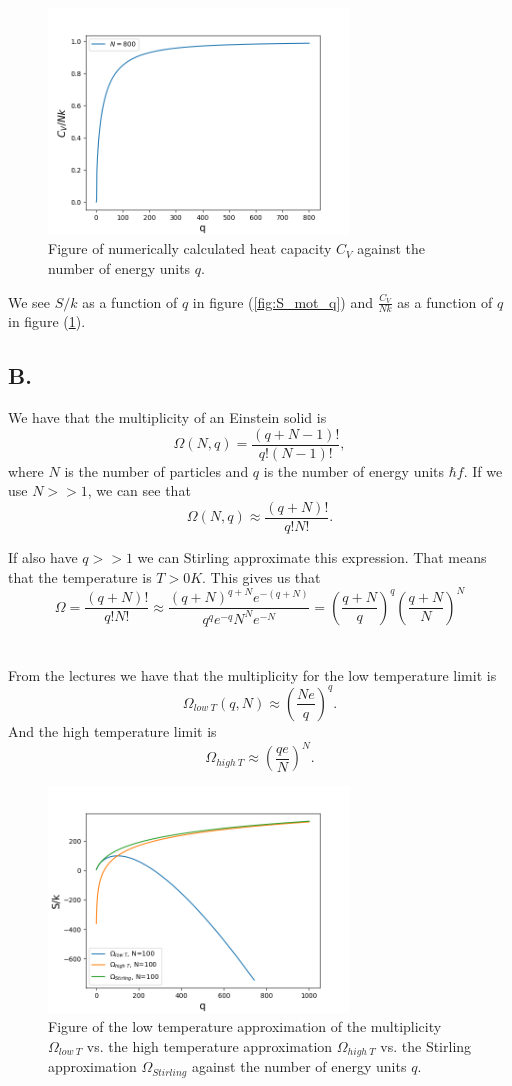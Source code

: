 \documentclass[reprint,english,notitlepage]{revtex4-1}  %
\begin{document}
\begin{figure}
\centering
\includegraphics[width=8cm]{../figures/C_mot_q.png}
\caption{Figure of numerically calculated heat capacity $C_V$ against the number of energy units $q$.}
\label{fig:C_mot_q}
\end{figure}

We see $S/k$ as a function of $q$ in figure (\ref{fig:S_mot_q}) and $\frac{C_V}{Nk}$ as a function of $q$ in figure (\ref{fig:C_mot_q}).

\subsection*{B.}

We have that the multiplicity of an Einstein solid is $$\Omega(N,q)=\frac{(q+N-1)!}{q!(N-1)!},$$
where $N$ is the number of particles and $q$ is the number of energy units $\hbar f$. If we use $N>>1$, we can see that $$ \Omega(N,q)\approx \frac{(q+N)!}{q!N!}.$$

If also have $q>>1$ we can Stirling approximate this expression. That means that the temperature is $T>0K$. This gives us that
$$ \Omega = \frac{(q+N)!}{q!N!}\approx\frac{(q+N)^{q+N} e^{-(q+N)}}{q^q e^{-q} N^N e^{-N}}=(\frac{q+N}{q})^q(\frac{q+N}{N})^N$$ 
\\~\\
From the lectures we have that the multiplicity for the low temperature limit is $$\Omega_{low\ T}(q,N)\approx (\frac{Ne}{q})^q.$$
And the high temperature limit is $$ \Omega_{high\ T}\approx (\frac{qe}{N})^N.$$

\begin{figure}
\centering
\includegraphics[width=8cm]{../figures/omegas.png}
\caption{Figure of the low temperature approximation of the multiplicity $\Omega_{low\ T}$ vs. the high temperature approximation $\Omega_{high\ T}$ vs. the Stirling approximation $\Omega_{Stirling}$ against the number of energy units $q$.}
\label{fig:omegas}
\end{figure}
\end{document}
